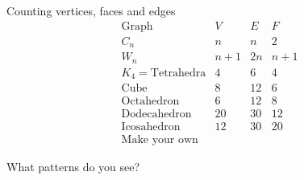 \documentclass{beamer}
\begin{document}
\begin{frame}{Counting vertices, faces and edges}
  $$\begin{array}{c|c|c|c}
    \text{Graph} & V & E & F  \\ \hline
    C_n & n & n & 2 \\
    W_n & n+1 & 2n & n+1 \\
    K_4=\text{Tetrahedra} & 4 & 6 & 4 \\
    \text{Cube} & 8 & 12 & 6 \\
    \text{Octahedron} & 6 & 12 & 8 \\
    \text{Dodecahedron} & 20 & 30 & 12 \\
    \text{Icosahedron} & 12 & 30 & 20 \\
    \text{Make your own} & & & 
  \end{array}$$
\begin{block}{What patterns do you see?}
  \end{block}
  \end{frame}
\end{document}
